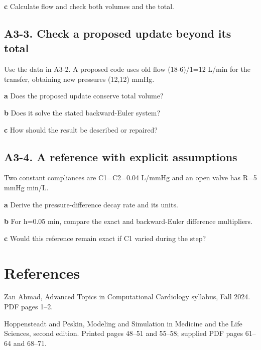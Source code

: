 \documentclass[11pt,letterpaper]{article}
\theoremstyle{definition}\newtheorem{definition}{Definition}\newtheorem{example}{Example}
\numberwithin{equation}{section}
\begin{document}
\textbf{c} Calculate flow and check both volumes and the total.

\par\noindent\begin{minipage}{\linewidth}
\subsection*{A3-3. Check a proposed update beyond its total}
Use the data in A3-2. A proposed code uses old flow (18-6)/1=\allowbreak{}12 L/min for the transfer, obtaining new pressures (12,12) mmHg.

\textbf{a} Does the proposed update conserve total volume?

\end{minipage}\par\medskip
\textbf{b} Does it solve the stated backward-Euler system?

\textbf{c} How should the result be described or repaired?

\par\noindent\begin{minipage}{\linewidth}
\subsection*{A3-4. A reference with explicit assumptions}
Two constant compliances are C1=\allowbreak{}C2=\allowbreak{}0.04 L/mmHg and an open valve has R=\allowbreak{}5 mmHg min/L.

\textbf{a} Derive the pressure-difference decay rate and its units.

\end{minipage}\par\medskip
\textbf{b} For h=\allowbreak{}0.05 min, compare the exact and backward-Euler difference multipliers.

\textbf{c} Would this reference remain exact if C1 varied during the step?

\section*{References}
\noindent\begin{minipage}{\linewidth}
Zan Ahmad, Advanced Topics in Computational Cardiology syllabus, Fall 2024. PDF pages 1--2.

\end{minipage}\par\medskip
\noindent\begin{minipage}{\linewidth}
Hoppensteadt and Peskin, Modeling and Simulation in Medicine and the Life Sciences, second edition. Printed pages 48--51 and 55--58; supplied PDF pages 61--64 and 68--71.

\end{minipage}\par\medskip
\end{document}
